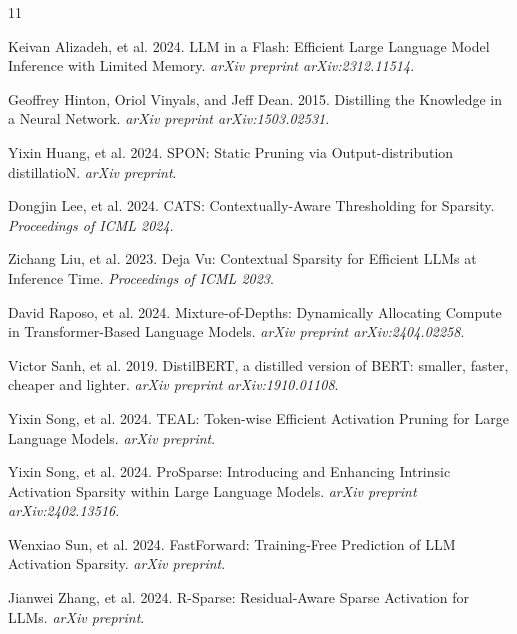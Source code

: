 \documentclass[11pt,a4paper]{article}
\begin{document}
\begin{thebibliography}{11}

Keivan Alizadeh, et al. 2024.
LLM in a Flash: Efficient Large Language Model Inference with Limited Memory.
\textit{arXiv preprint arXiv:2312.11514}.

Geoffrey Hinton, Oriol Vinyals, and Jeff Dean. 2015.
Distilling the Knowledge in a Neural Network.
\textit{arXiv preprint arXiv:1503.02531}.

Yixin Huang, et al. 2024.
SPON: Static Pruning via Output-distribution distillatioN.
\textit{arXiv preprint}.

Dongjin Lee, et al. 2024.
CATS: Contextually-Aware Thresholding for Sparsity.
\textit{Proceedings of ICML 2024}.

Zichang Liu, et al. 2023.
Deja Vu: Contextual Sparsity for Efficient LLMs at Inference Time.
\textit{Proceedings of ICML 2023}.

David Raposo, et al. 2024.
Mixture-of-Depths: Dynamically Allocating Compute in Transformer-Based Language Models.
\textit{arXiv preprint arXiv:2404.02258}.

Victor Sanh, et al. 2019.
DistilBERT, a distilled version of BERT: smaller, faster, cheaper and lighter.
\textit{arXiv preprint arXiv:1910.01108}.

Yixin Song, et al. 2024.
TEAL: Token-wise Efficient Activation Pruning for Large Language Models.
\textit{arXiv preprint}.

Yixin Song, et al. 2024.
ProSparse: Introducing and Enhancing Intrinsic Activation Sparsity within Large Language Models.
\textit{arXiv preprint arXiv:2402.13516}.

Wenxiao Sun, et al. 2024.
FastForward: Training-Free Prediction of LLM Activation Sparsity.
\textit{arXiv preprint}.

Jianwei Zhang, et al. 2024.
R-Sparse: Residual-Aware Sparse Activation for LLMs.
\textit{arXiv preprint}.

\end{thebibliography}
\end{document}
